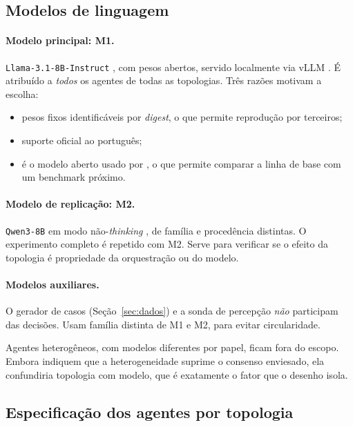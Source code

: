 \documentclass[12pt]{article}
\begin{document}
\subsection{Modelos de linguagem}

\paragraph{Modelo principal: M1.} \texttt{Llama-3.1-8B-Instruct} \citep{grattafiori2024llama3}, com pesos abertos, servido localmente via vLLM \citep{kwon2023vllm}. É atribuído a \emph{todos} os agentes de todas as topologias. Três razões motivam a escolha:
\begin{itemize}
    \item pesos fixos identificáveis por \textit{digest}, o que permite reprodução por terceiros;
    \item suporte oficial ao português;
    \item é o modelo aberto usado por \citet{morla2026agentfairbench}, o que permite comparar a linha de base com um benchmark próximo.
\end{itemize}

\paragraph{Modelo de replicação: M2.} \texttt{Qwen3-8B} em modo não-\textit{thinking} \citep{yang2025qwen3}, de família e procedência distintas. O experimento completo é repetido com M2. Serve para verificar se o efeito da topologia é propriedade da orquestração ou do modelo.

\paragraph{Modelos auxiliares.} O gerador de casos (Seção~\ref{sec:dados}) e a sonda de percepção \emph{não} participam das decisões. Usam família distinta de M1 e M2, para evitar circularidade.

Agentes heterogêneos, com modelos diferentes por papel, ficam fora do escopo. Embora \citet{okawa2026emergence} indiquem que a heterogeneidade suprime o consenso enviesado, ela confundiria topologia com modelo, que é exatamente o fator que o desenho isola.

\subsection{Especificação dos agentes por topologia}
\end{document}
